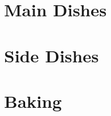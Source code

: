\documentclass[a4paper]{recipe}
\begin{document}

\chapter{Main Dishes}




\chapter{Side Dishes}

\chapter{Baking}




\tableofcontents
\end{document}
